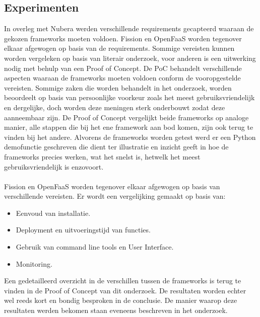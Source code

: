 \documentclass[a0,portrait]{a0poster}
\begin{document}
\begin{multicols}{2}
\color{Black} %
\color{HoGentAccent1} 
\section*{Experimenten}
\color{black}
In overleg met Nubera werden verschillende requirements gecapteerd waaraan de gekozen frameworks moeten voldoen. Fission en OpenFaaS worden tegenover elkaar afgewogen op basis van de requirements. Sommige vereisten kunnen worden vergeleken op basis van literair onderzoek, voor anderen is een uitwerking nodig met behulp van een Proof of Concept. 
De PoC behandelt verschillende aspecten waaraan de frameworks moeten voldoen conform de vooropgestelde vereisten. Sommige zaken die worden behandelt in het onderzoek, worden beoordeelt op basis van persoonlijke voorkeur zoals het meest gebruiksvriendelijk en dergelijke, doch worden deze meningen sterk onderbouwt zodat deze aanneembaar zijn. De Proof of Concept vergelijkt beide frameworks op analoge manier, alle stappen die bij het ene framework aan bod komen, zijn ook terug te vinden bij het andere. Alvorens de frameworks worden getest werd er een Python demofunctie geschreven die dient ter illustratie en inzicht geeft in hoe de frameworks precies werken, wat het snelst is, hetwelk het meest gebruiksvriendelijk is enzovoort.
\\\\
Fission en OpenFaaS worden tegenover elkaar afgewogen op basis van verschillende vereisten. Er wordt een vergelijking gemaakt op basis van:
\begin{itemize}
    \item Eenvoud van installatie.
    \item Deployment en uitvoeringstijd van functies.
    \item Gebruik van command line tools en User Interface.
    \item Monitoring.\\
\end{itemize}

Een gedetailleerd overzicht in de verschillen tussen de frameworks is terug te vinden in de Proof of Concept van dit onderzoek. De resultaten worden echter wel reeds kort en bondig besproken in de conclusie. De manier waarop deze resultaten werden bekomen staan eveneens beschreven in het onderzoek.
\\\\\\

\color{HoGentAccent1} 

\end{multicols}
\end{document}

